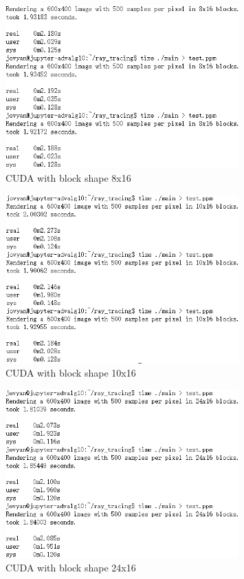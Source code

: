 \documentclass[UTF8, a4paper, 11pt]{article}
\begin{document}
\begin{figure}[H]
    \centering
    \includegraphics[width=0.8\textwidth]{8x16.png}
    \caption{CUDA with block shape 8x16}
\end{figure}
\begin{figure}[H]
    \centering
    \includegraphics[width=0.8\textwidth]{10x16.png}
    \caption{CUDA with block shape 10x16}
\end{figure}
\begin{figure}[H]
    \centering
    \includegraphics[width=0.8\textwidth]{24x16.png}
    \caption{CUDA with block shape 24x16}
\end{figure}
\end{document}
